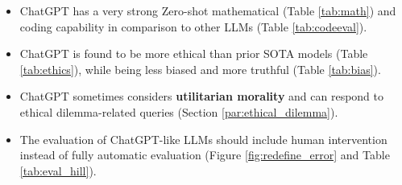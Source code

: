 \documentclass[11pt]{article}
\begin{document}
\begin{itemize}[leftmargin=*,topsep=2pt,itemsep=2pt,parsep=0pt]
    \item ChatGPT has a very strong Zero-shot mathematical (Table \ref{tab:math}) and coding capability in comparison to other LLMs (Table \ref{tab:codeeval}). 

    \item ChatGPT is found to be more ethical  than prior SOTA models (Table \ref{tab:ethics}), while being less biased and more truthful (Table \ref{tab:bias}).
    
    \item ChatGPT sometimes considers \textbf{utilitarian morality} and can respond to ethical dilemma-related queries (Section \ref{par:ethical_dilemma}).
    
    \item The evaluation of ChatGPT-like LLMs should include human intervention instead of fully automatic evaluation (Figure \ref{fig:redefine_error} and Table \ref{tab:eval_hill}). 
    
    
\end{itemize}

\begin{table*}
\centering
{}
\caption{\small{Performance comparisons of ChatGPT with the PaLM-540B \cite{chowdhery2022palm} model and PaLM 2-L \cite{palm2} model in the development split of the \textbf{SuperGLUE} benchmark. Here,  \emph{NA} refers to \emph{Not Available}.}}
\label{tab:results_superglue_open_domain}
\vspace{-.5cm}
\end{table*} 
\end{document}
